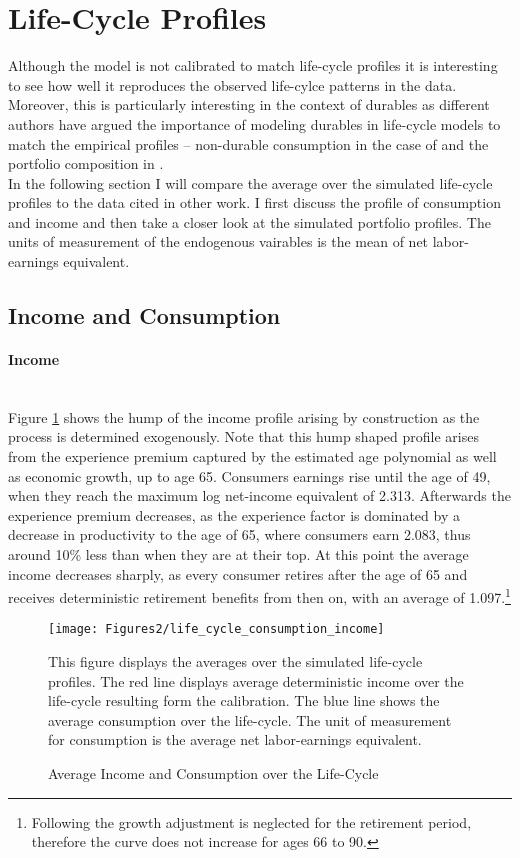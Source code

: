 \documentclass[a4paper,12pt,legno]{article}
\newcommand{\myparagraph}[1]{\paragraph{#1}\mbox{}\\}
\begin{document}
\section{Life-Cycle Profiles}
\label{life_cycle_profiles}

Although the model is not calibrated to match life-cycle profiles it is interesting to see how well it reproduces the observed life-cylce patterns in the data. Moreover, this is particularly interesting in the context of durables as different authors have argued the importance of modeling durables in life-cycle models to match the empirical profiles \--- non-durable consumption in the case of \cite{FV&K2011} and the portfolio composition in \cite{yang2009}. \\
In the following section I will compare the average over the simulated life-cycle profiles to the data cited in other work. I first discuss the profile of consumption and income and then take a closer look at the simulated portfolio profiles. 
The units of measurement of the endogenous vairables is the mean of net labor-earnings equivalent.

\subsection{Income and Consumption}

\myparagraph{Income} Figure \ref{consumption_life_cycle} shows the hump of the income profile arising by construction as the process is determined exogenously. Note that this hump shaped profile arises from the experience premium captured by the estimated age polynomial as well as economic growth, up to age 65. Consumers earnings rise until the age of 49, when they reach the maximum log net-income equivalent of 2.313. Afterwards the experience premium decreases, as the experience factor is dominated by a decrease in productivity to the age of 65, where consumers earn 2.083, thus around 10\% less than when they are at their top. At this point the average income decreases sharply, as every consumer retires after the age of 65 and receives deterministic retirement benefits from then on, with an average of 1.097.\footnote{Following \cite{hintermaier2011} the growth adjustment is neglected for the retirement period, therefore the curve does not increase for ages 66 to 90.} 

\begin{figure}[!htbp]
\caption{Average Income and Consumption over the Life-Cycle} 
\label{consumption_life_cycle}	%
\centering
\texttt{[image: Figures2/life\_cycle\_consumption\_income]}  %

\begin{minipage}{0.8\linewidth}
\footnotesize{This figure displays the averages over the simulated life-cycle profiles. The red line displays average deterministic income over the life-cycle resulting form the calibration. The blue line shows the average consumption over the life-cycle. The unit of measurement for consumption is the average net labor-earnings equivalent.}
\end{minipage}

\end{figure}
\end{document}
